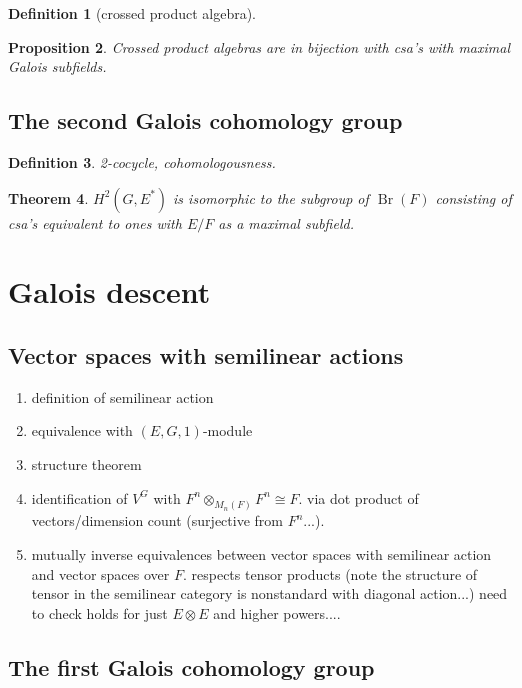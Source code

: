 \documentclass[12pt]{report}
\theoremstyle{plain}
\newtheorem{thm}{Theorem}[section]
\newtheorem{defn}[thm]{Definition}
\newtheorem{prop}[thm]{Proposition}
\newcommand{\oper}[1]{\operatorname{#1}}
\newcommand{\Br}{\oper{Br}}
\begin{document}
\begin{defn}[crossed product algebra]
\end{defn}

\begin{prop}
Crossed product algebras are in bijection with csa's with maximal Galois
subfields.
\end{prop}

\subsection{The second Galois cohomology group}

\begin{defn}
2-cocycle, cohomologousness.
\end{defn}

\begin{thm}
$H^2(G, E^*)$ is isomorphic to the subgroup of $\Br(F)$ consisting of csa's
equivalent to ones with $E/F$ as a maximal subfield.
\end{thm}

\section{Galois descent}

\subsection{Vector spaces with semilinear actions}
\begin{enumerate}
\item
definition of semilinear action
\item
equivalence with $(E,G,1)$-module
\item
structure theorem
\item
identification of $V^G$ with $F^n \otimes_{M_n(F)} F^n \cong F$. via dot
product of vectors/dimension count (surjective from $F^n$...).
\item
mutually inverse equivalences between vector spaces with semilinear action and
vector spaces over $F$. respects tensor products (note the structure of
tensor in the semilinear category is nonstandard with diagonal action...)
need to check holds for just $E \otimes E$ and higher powers....
\end{enumerate}

\subsection{The first Galois cohomology group}
\end{document}
